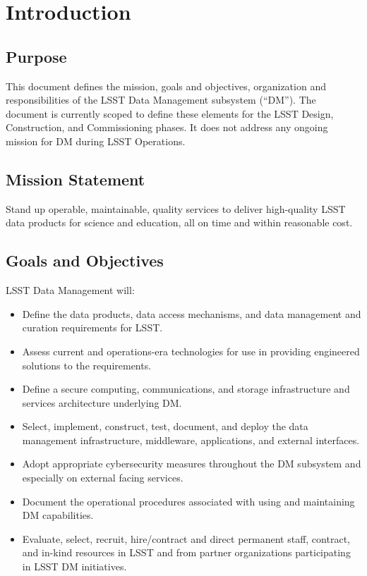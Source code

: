 \section{Introduction}
\subsection{Purpose}
This document defines the mission, goals and objectives, organization and responsibilities of the LSST Data Management subsystem (``DM'').
The document is currently scoped to define these elements for the LSST Design, Construction, and Commissioning phases.
It does not address any ongoing mission for DM during LSST Operations.

\subsection{Mission Statement}
Stand up operable, maintainable, quality services to deliver high-quality LSST data products for science and education, all on time and within reasonable cost.

\subsection{Goals and Objectives}
LSST Data Management will:
\begin{itemize}
\item Define the data products, data access mechanisms, and data management and curation requirements for LSST.
\item Assess current and operations-era technologies for use in providing engineered solutions to the requirements.
\item Define a secure computing, communications, and storage infrastructure and services architecture underlying DM.
\item Select, implement, construct, test, document, and deploy the data management infrastructure, middleware, applications, and external interfaces.
\item Adopt appropriate cybersecurity measures throughout the DM subsystem and especially on external facing services.
\item Document the operational procedures associated with using and maintaining DM capabilities.
\item Evaluate, select, recruit, hire/contract and direct permanent staff, contract, and in-kind resources in LSST and from partner organizations participating in LSST DM initiatives.

\end{itemize}

